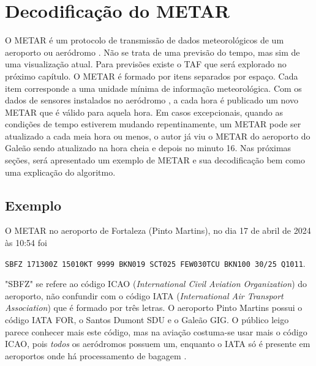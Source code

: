 \chapter{Decodificação do METAR}

O METAR é um protocolo de transmissão de dados meteorológicos de um aeroporto ou 
aeródromo \cite{metar-what}. Não se trata de uma previsão do tempo, mas sim de uma visualização atual. 
Para previsões existe o TAF que será explorado no próximo capítulo.
O METAR é formado por itens separados por espaço. Cada item corresponde a uma 
unidade mínima de informação meteorológica. Com os dados de sensores instalados 
no aeródromo \cite{metar-weather-gov}, a cada hora é publicado um novo METAR que
é válido para aquela hora. Em casos excepcionais, quando as condições de tempo 
estiverem mudando repentinamente, um METAR pode ser atualizado a cada meia hora
 \cite{METAR-speci} ou menos, o autor já viu o METAR do aeroporto do Galeão sendo atualizado
 na hora cheia e depois no minuto 16. Nas próximas seções, será apresentado um 
 exemplo de METAR e sua decodificação bem como uma explicação do algoritmo.

\section{Exemplo}
O METAR no aeroporto de Fortaleza (Pinto Martins)\cite{METAR-sbfz}, no dia 17 de 
abril de 2024 às 10:54 foi

\texttt{SBFZ 171300Z 15010KT 9999 BKN019 SCT025 FEW030TCU BKN100 30/25 Q1011}.

"SBFZ" se refere ao código ICAO (\textit{International Civil Aviation Organization}) do 
aeroporto, não confundir com o código IATA (\textit{International Air Transport Association}) 
que é formado por três letras. O aeroporto Pinto Martins possui o código IATA FOR, 
o Santos Dumont SDU e o Galeão GIG. O público leigo parece conhecer mais este 
código, mas na aviação costuma-se usar mais o código ICAO, pois \textit{todos} os 
aeródromos possuem um, enquanto o IATA só é presente em aeroportos onde há 
processamento de bagagem \cite{iata-codes} \cite{icao-codes}.

